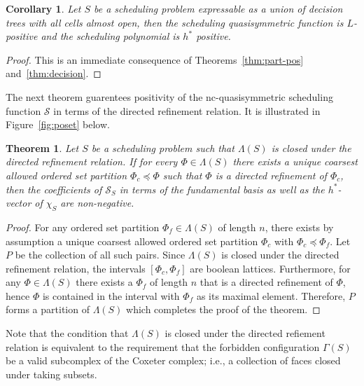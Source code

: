 \documentclass[12pt,reqno]{amsart}
\numberwithin{definition}{section}
\newtheorem{theorem}[definition]{Theorem}
\newtheorem{corollary}[definition]{Corollary}
\theoremstyle{definition}
\newcommand{\SSS}{\mathcal{S}}
\newcommand{\allow}{\Lambda} %
\newcommand{\poly}{\chi} %
\newcommand{\forb}{\Gamma} %
\begin{document}
\begin{corollary}
Let $S$ be a scheduling problem expressable as a union of decision trees with all cells almost open, then the scheduling quasisymmetric function is $L$-positive and the scheduling polynomial is $h^*$ positive. 
\end{corollary}
\begin{proof}
This is an immediate consequence of Theorems~\ref{thm:part-pos} and~\ref{thm:decision}.
\end{proof}

The next theorem guarentees positivity of the nc-quasisymmetric scheduling function $\SSS$ in terms of the directed refinement relation. It is illustrated in Figure~\ref{fig:poset} below.

\begin{theorem}
\label{unique}
Let $S$ be a scheduling problem such that $\allow(S)$ is closed under the directed refinement relation. If for every $\Phi \in \allow(S)$ there exists a \emph{unique} coarsest allowed ordered set partition $\Phi_c \preceq \Phi$ such that $\Phi$ is a directed refinement of $\Phi_c$, then the coefficients of $\SSS_S$ in terms of the fundamental basis as well as the $h^*$-vector of $\poly_S$ are non-negative.
\end{theorem}

\begin{proof}
For any  ordered set partition $\Phi_f \in \allow(S)$ of length $n$, there exists by assumption a unique coarsest allowed ordered set partition $\Phi_c$ with $\Phi_c\preceq\Phi_f$. Let $P$ be the collection of all such pairs.  Since $\allow(S)$ is closed under the directed refinement relation, the intervals  $[\Phi_c, \Phi_f]$ are boolean lattices.
Furthermore,  for any  $\Phi \in \allow(S)$ there exists a $\Phi_f$ of length $n$ that is a directed refinement of $\Phi$, hence $\Phi$ is contained in the interval with $\Phi_f$ as its maximal element. Therefore, $P$ forms a partition of $\allow(S)$  which completes the proof of the theorem.
\end{proof}


Note that the condition that $\allow(S)$ is closed under the directed
refiement relation is equivalent to the requirement that the forbidden
configuration $\forb(S)$ be a valid subcomplex of the Coxeter complex; i.e., a
collection of faces closed under taking subsets.
\end{document}
